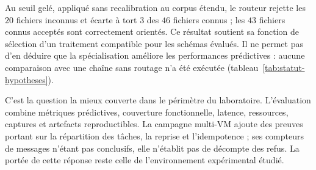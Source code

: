 
    \item[\textbf{QR3.}]
    Au seuil gelé, appliqué sans recalibration au corpus étendu, le routeur rejette les $20$ fichiers inconnus et écarte à tort $3$ des $46$ fichiers connus ; les $43$ fichiers connus acceptés sont correctement orientés. Ce résultat soutient sa fonction de sélection d'un traitement compatible pour les schémas évalués. Il ne permet pas d'en déduire que la spécialisation améliore les performances prédictives : aucune comparaison avec une chaîne sans routage n'a été exécutée (tableau~\ref{tab:statut-hypotheses}).

    \item[\textbf{QR6.}]
    C'est la question la mieux couverte dans le périmètre du laboratoire. L'évaluation combine métriques prédictives, couverture fonctionnelle, latence, ressources, captures et artefacts reproductibles. La campagne multi-VM ajoute des preuves portant sur la répartition des tâches, la reprise et l'idempotence ; ses compteurs de messages n'étant pas conclusifs, elle n'établit pas de décompte des refus. La portée de cette réponse reste celle de l'environnement expérimental étudié.
